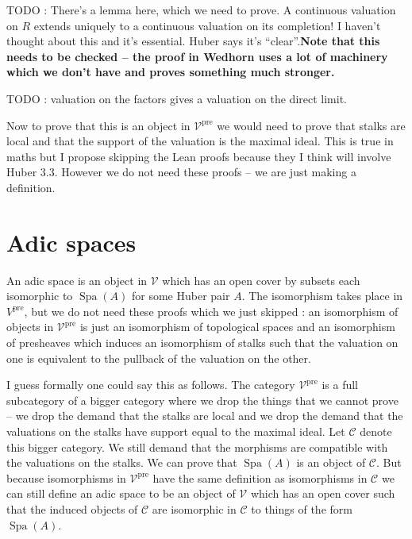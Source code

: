 \documentclass{amsart}
\DeclareMathOperator{\Spa}{Spa}
\DeclareMathOperator{\pre}{pre}
\theoremstyle{plain}
\theoremstyle{remark}
\begin{document}
TODO : There's a lemma here, which we need to prove. A continuous valuation on $R$ extends uniquely to a continuous valuation on its completion! I haven't thought about this and it's essential. Huber says it's ``clear''.{\bf Note that this needs to be checked -- the proof in Wedhorn uses a lot of machinery which we don't have and proves something much stronger.}

TODO : valuation on the factors gives a valuation on the direct limit.

Now to prove that this is an object in $\mathcal{V}^{\pre}$ we would need to prove that stalks are local and that the support of the valuation is the maximal ideal. This is true in maths but I propose skipping the Lean proofs because they I think will involve Huber 3.3. However we do not need these proofs -- we are just making a definition.

\section{Adic spaces}

An adic space is an object in $\mathcal{V}$ which has an open cover by subsets each isomorphic to $\Spa(A)$ for some Huber pair $A$. The isomorphism takes place in $V^{\pre}$, but we do not need these proofs which we just skipped : an isomorphism of objects in $\mathcal{V}^{\pre}$ is just an isomorphism of topological spaces and an isomorphism of presheaves which induces an isomorphism of stalks such that the valuation on one is equivalent to the pullback of the valuation on the other.

I guess formally one could say this as follows. The category $\mathcal{V}^{\pre}$  is a full subcategory of a bigger category where we drop the things that we cannot prove -- we drop the demand that the stalks are local and we drop the demand that the valuations on the stalks have support equal to the maximal ideal. Let $\mathcal{C}$ denote this bigger category. We still demand that the morphisms are compatible with the valuations on the stalks. We can prove that $\Spa(A)$ is an object of $\mathcal{C}$. But because isomorphisms in $\mathcal{V}^{\pre}$ have the same definition as isomorphisms in $\mathcal{C}$ we can still define an adic space to be an object of $\mathcal{V}$ which has an open cover such that the induced objects of $\mathcal{C}$ are isomorphic in $\mathcal{C}$ to things of the form $\Spa(A)$.
\end{document}
